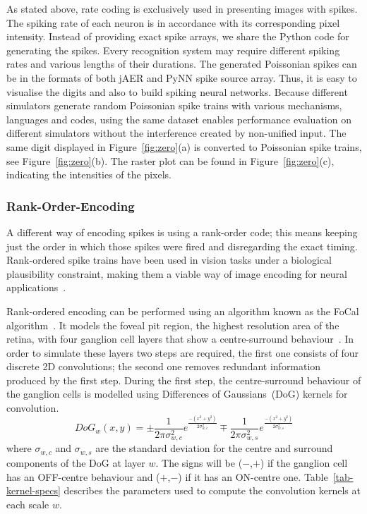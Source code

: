 \documentclass{frontiersENG} %
\begin{document}
As stated above, rate coding is exclusively used in presenting images with spikes.
The spiking rate of each neuron is in accordance with its corresponding pixel intensity.
Instead of providing exact spike arrays, we share the Python code for generating the spikes.
Every recognition system may require different spiking rates and various lengths of their durations.
The generated Poissonian spikes can be in the formats of both jAER and PyNN spike source array.
Thus, it is easy to visualise the digits and also to build spiking neural networks.
Because different simulators generate random Poissonian spike trains with various mechanisms, languages and codes, using the same dataset enables performance evaluation on different simulators without the interference created by non-unified input.
The same digit displayed in Figure~\ref{fig:zero}(a) is converted to Poissonian spike trains, see Figure~\ref{fig:zero}(b).
The raster plot can be found in Figure~\ref{fig:zero}(c), indicating the intensities of the pixels.



\subsubsection{Rank-Order-Encoding}
A different way of encoding spikes is using a rank-order code; this means
keeping just the order in which those spikes were fired and disregarding the exact timing. Rank-ordered spike trains have been used in vision tasks under a biological plausibility constraint, making them a viable way of image encoding for neural applications~\citep{van2001rate,sen2009evaluating,masmoudi2010novel}.

Rank-ordered encoding can be performed using an algorithm known as the
{FoCal algorithm~\citep{sen2009evaluating}}.
It models the foveal pit region, the highest resolution area of the retina, with four ganglion cell layers that show a centre-surround behaviour~\citep{kolb2003retina}. In order to simulate these layers two steps are required, the first one consists of four discrete 2D convolutions; the second one removes redundant information produced by the first step. During the first step, the centre-surround behaviour of the ganglion cells is modelled using Differences of Gaussians~(DoG) kernels for convolution. 
\begin{equation}
\label{eq-dog}
DoG_w(x,y) = \pm\frac{1}{2\pi\sigma_{w,c}^2}e^{\frac{-(x^2 + y^2)}{2\sigma_{w,c}^2}}
\mp\frac{1}{2\pi\sigma_{w,s}^2}e^{\frac{-(x^2 + y^2)}{2\sigma_{w,s}^2}}
\end{equation}
where $\sigma_{w,c}$ and $\sigma_{w,s}$ are the standard deviation for the 
centre and surround components of the DoG at layer $w$. The signs 
will be ($-$,$+$) if the ganglion cell has an OFF-centre behaviour and 
($+$,$-$) if it has an ON-centre one. Table~\ref{tab-kernel-specs} 
describes the parameters used to compute the convolution kernels at each 
scale $w$.
\end{document}
